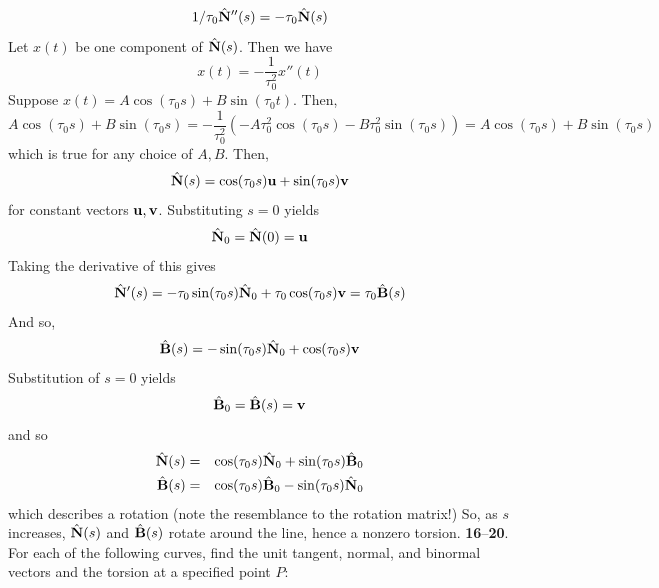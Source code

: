 \documentclass[12pt]{amsbook}
\begin{document}
$$1/\tau_0\hat{\bf N}''(s)=-\tau_0\hat{\bf N}(s)$$
Let $x(t)$ be one component of $\hat{\bf N}(s)$. Then we have
$$x(t)=-\frac{1}{\tau_0^2}x''(t)$$
Suppose $x(t)=A\cos(\tau_0s)+B\sin(\tau_0t)$. Then,
$$A\cos(\tau_0s)+B\sin(\tau_0s)=-\frac{1}{\tau_0^2}(-A\tau_0^2\cos(\tau_0s)-B\tau_0^2\sin(\tau_0s))=A\cos(\tau_0s)+B\sin(\tau_0s)$$
which is true for any choice of $A,B$. Then,
$$\hat{\bf N}(s)=\cos(\tau_0s){\bf u}+\sin(\tau_0s){\bf v}$$
for constant vectors ${\bf u}, {\bf v}$. Substituting $s=0$ yields
$$\hat{\bf N}_0=\hat{\bf N}(0)={\bf u}$$
Taking the derivative of this gives
$$\hat{\bf N}'(s)=-\tau_0\sin(\tau_0s)\hat{\bf N}_0+\tau_0\cos(\tau_0s){\bf v}=\tau_0\hat{\bf B}(s)$$
And so,
$$\hat{\bf B}(s)=-\sin(\tau_0s)\hat{\bf N}_0+\cos(\tau_0s){\bf v}$$
Substitution of $s=0$ yields
$$\hat{\bf B}_0=\hat{\bf B}(s)={\bf v}$$
and so
\begin{eqnarray*}
\hat{\bf N}(s)&=&\cos(\tau_0s)\hat{\bf N}_0+\sin(\tau_0s)\hat{\bf B}_0 \\
\hat{\bf B}(s)&=&\cos(\tau_0s)\hat{\bf B}_0-\sin(\tau_0s)\hat{\bf N}_0
\end{eqnarray*}
which describes a rotation (note the resemblance to the rotation matrix!)
So, as $s$ increases, $\hat{\bf N}(s)$ and $\hat{\bf B}(s)$ rotate around the line, hence a nonzero torsion. 
\noindent
{\small {\bf 16}--{\bf 20}}. For each of the following curves, find the unit tangent, normal, and
binormal vectors and the torsion at a specified point $P$:
\end{document}
